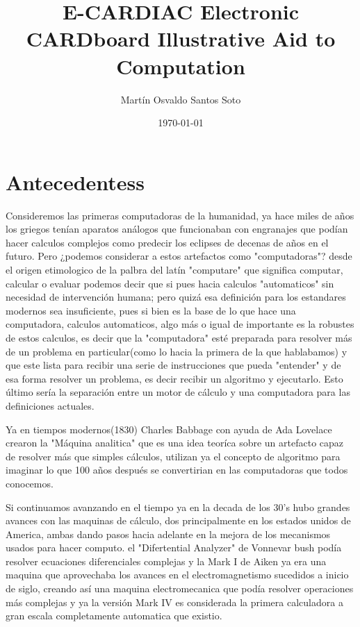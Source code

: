 \documentclass[12pt]{article}
\title{E-CARDIAC Electronic CARDboard Illustrative Aid to Computation}
\author{Martín Osvaldo Santos Soto}
\date{\today}
\begin{document}
	\maketitle
	
	\section{ Antecedentess }
	Consideremos las primeras computadoras de la humanidad, ya hace miles de años los griegos tenían aparatos análogos que funcionaban con engranajes
	que podían hacer calculos complejos como predecir los eclipses de decenas de años en el futuro. Pero ¿podemos considerar a estos artefactos como "computadoras"?
	desde el origen etimologico de la palbra del latín "computare" que significa computar, calcular o evaluar podemos decir que si pues hacia calculos "automaticos"
	sin necesidad de intervención humana; pero quizá esa definición para los estandares modernos sea insuficiente, pues si bien es la base de lo que hace
	una computadora, calculos automaticos, algo más o igual de importante es la robustes de estos calculos, es decir que la "computadora" esté preparada
	para resolver más de un problema en particular(como lo hacia la primera de la que hablabamos) y que este lista para recibir una serie de instrucciones
	que pueda "entender" y de esa forma resolver un problema, es decir recibir un algoritmo y ejecutarlo. Esto último sería la separación entre
	un motor de cálculo y una computadora para las definiciones actuales.
	
	Ya en tiempos modernos(1830) Charles Babbage con ayuda de Ada Lovelace crearon la "Máquina analitica" que es una idea teoríca sobre un artefacto capaz
	de resolver más que simples cálculos, utilizan ya el concepto de algoritmo para imaginar lo que 100 años después se convertirian en las computadoras que todos
	conocemos.
	
	Si continuamos avanzando en el tiempo ya en la decada de los 30's hubo grandes avances con las maquinas de cálculo, dos principalmente en los
	estados unidos de America, ambas dando pasos hacia adelante en la mejora de los mecanismos usados para hacer computo. el "Difertential Analyzer" de
	Vonnevar bush podía resolver ecuaciones diferenciales complejas y la Mark I de Aiken ya era una maquina que aprovechaba los avances en el electromagnetismo
	sucedidos a inicio de siglo, creando así una maquina electromecanica que podía resolver operaciones más complejas y ya la versión Mark IV es considerada
	la primera calculadora a gran escala completamente automatica que existio.
	
\end{document}
